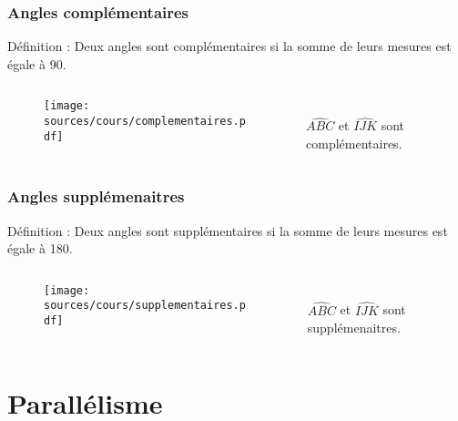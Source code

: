 \documentclass{beamer}
\begin{document}
\begin{frame}
  \frametitle{Angles complémentaires}
  \begin{alertblock}{Définition :}	
    Deux angles sont complémentaires si la somme de leurs mesures est égale à 90.
  \end{alertblock}
  \begin{columns}[t]
    \begin{column}{5cm}
      \begin{figure}[H]
        \centering
        \texttt{[image: sources/cours/complementaires.pdf]}
      \end{figure}
    \end{column}
    \begin{column}{5cm}
      \vspace{1cm}\\
      $\widehat{ABC}$ et $\widehat{IJK}$ sont complémentaires.  
    \end{column}
  \end{columns}    
\end{frame}

\begin{frame}
  \frametitle{Angles supplémenaitres}
  \begin{alertblock}{Définition :}	
    Deux angles sont supplémentaires si la somme de leurs mesures est égale à 180.
  \end{alertblock}
  \begin{columns}[t]
    \begin{column}{5cm}
      \begin{figure}[H]
        \centering
        \texttt{[image: sources/cours/supplementaires.pdf]}
      \end{figure}
    \end{column}
    \begin{column}{5cm}
      \vspace{1cm}\\
      $\widehat{ABC}$ et $\widehat{IJK}$ sont supplémenaitres.  
    \end{column}
  \end{columns}    
\end{frame}

\section{Parallélisme}
\end{document}
